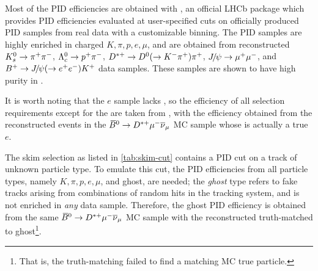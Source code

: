 Most of the PID efficiencies are obtained with \pidcalib,
an official LHCb package which provides PID efficiencies evaluated at
user-specified cuts on officially produced PID samples from real data with a
customizable binning.
The PID samples are highly enriched in charged $K, \pi, p, e, \mu$, and are
obtained from reconstructed $K_s^0 \rightarrow {\ensuremath{{\pi}^+}} {\ensuremath{{\pi}^-}}$,
$\Lambda_c^0 \rightarrow p^+ {{\pi}^-}$,
${{D}^{*+}} \rightarrow {\ensuremath{{D}^0}} (\rightarrow {\ensuremath{{K}^-}} {\ensuremath{{\pi}^+}}) {{\pi}^+}$,
${{J\mskip -3mu/\mskip -2mu\psi}} \rightarrow {\ensuremath{\mu^+}} {\ensuremath{\mu^-}}$, and
${{{B}^+}} \rightarrow {\ensuremath{{J\mskip -3mu/\mskip -2mu\psi}}} (\rightarrow e^+ e^-) {{K}^+}$ data samples.
These samples are shown to have high purity in \cite{LHCb-DP-2012-003}.

It is worth noting that the \pidcalib $e$ sample lacks \UBDT,
so the efficiency of all selection requirements except for the \UBDT are taken
from \pidcalib,
with the \UBDT efficiency obtained from the reconstructed events in the
${{\kern 0.18em\overline{\kern -0.18em B}}{}^0} \rightarrow {\ensuremath{{D}^{*+}}} {\ensuremath{\mu^-}}{\ensuremath{{\overline{\nu}}_\mu}}$ MC sample
whose \muon is actually a true $e$.

The skim selection as listed in \cref{tab:skim-cut}
contains a  PID cut on a track of unknown particle type.
To emulate this cut, the PID efficiencies from all particle types, namely
$K, \pi, p, e, \mu$, and ghost, are needed;
the \emph{ghost} type refers to fake tracks arising from combinations of random
hits in the tracking system,
and is not enriched in \emph{any} data sample.
Therefore, the ghost PID efficiency is obtained from the same
${{\kern 0.18em\overline{\kern -0.18em B}}{}^0} \rightarrow {\ensuremath{{D}^{*+}}} {\ensuremath{\mu^-}}{\ensuremath{{\overline{\nu}}_\mu}}$ MC sample with the reconstructed \muon
truth-matched to ghost\footnote{
    That is, the truth-matching failed to find a matching MC true particle.
}.


